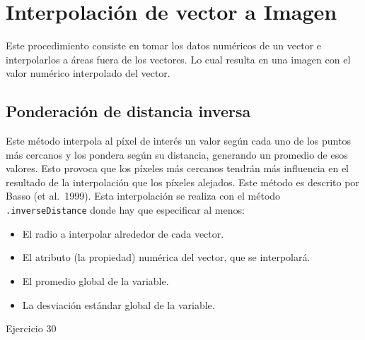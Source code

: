 \documentclass[
  12pt,
  letterpaper,
  twoside]{book}
\providecommand{\tightlist}{%
  \setlength{\itemsep}{0pt}\setlength{\parskip}{0pt}}
\begin{document}
\hypertarget{interpolaciuxf3n-de-vector-a-imagen}{%
\section{Interpolación de vector a Imagen}\label{interpolaciuxf3n-de-vector-a-imagen}}

Este procedimiento consiste en tomar los datos numéricos de un vector e interpolarlos a áreas fuera de los vectores. Lo cual resulta en una imagen con el valor numérico interpolado del vector.

\hypertarget{ponderaciuxf3n-de-distancia-inversa}{%
\subsection{Ponderación de distancia inversa}\label{ponderaciuxf3n-de-distancia-inversa}}

Este método interpola al píxel de interés un valor según cada uno de los puntos más cercanos y los pondera según su distancia, generando un promedio de esos valores. Esto provoca que los píxeles más cercanos tendrán más influencia en el resultado de la interpolación que los píxeles alejados. Este método es descrito por Basso (et al.~1999). Esta interpolación se realiza con el método \texttt{.inverseDistance} donde hay que especificar al menos:

\begin{itemize}
\tightlist
\item
  El radio a interpolar alrededor de cada vector.
\item
  El atributo (la propiedad) numérica del vector, que se interpolará.
\item
  El promedio global de la variable.
\item
  La desviación estándar global de la variable.
\end{itemize}

Ejercicio 30
\end{document}
